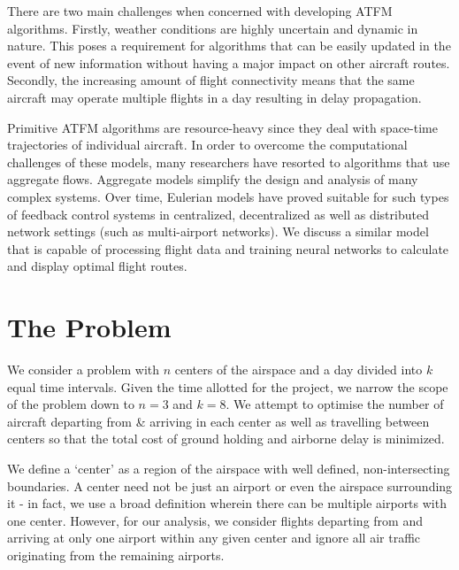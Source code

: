 \documentclass[conference]{IEEEtran}
\begin{document}
There are two main challenges when concerned with developing ATFM algorithms. Firstly, weather conditions are highly uncertain and dynamic in nature. This poses a requirement for algorithms that can be easily updated in the event of new information without having a major impact on other aircraft routes. Secondly, the increasing amount of flight connectivity means that the same aircraft may operate multiple flights in a day resulting in delay propagation.
\vspace{2mm}

Primitive ATFM algorithms are resource-heavy since they deal with space-time trajectories of individual aircraft. In order to overcome the computational challenges of these models, many researchers have resorted to algorithms that use aggregate flows. Aggregate models simplify the design and analysis of many complex systems. Over time, Eulerian models have proved suitable for such types of feedback control systems in centralized, decentralized as well as distributed network settings (such as multi-airport networks). We discuss a similar model that is capable of processing flight data and training neural networks to calculate and display optimal flight routes.

\section{\large The Problem}
\label{sec:sec2}
\vspace{1mm}

We consider a problem with $n$ centers of the airspace and a day divided into $k$ equal time intervals. Given the time allotted for the project, we narrow the scope of the problem down to $n=3$ and $k=8$. We attempt to optimise the number of aircraft departing from \& arriving in each center as well as travelling between centers so that the total cost of ground holding and airborne delay is minimized.
\vspace{2mm}

We define a `center' as a region of the airspace with well defined, non-intersecting boundaries. A center need not be just an airport or even the airspace surrounding it - in fact, we use a broad definition wherein there can be multiple airports with one center. However, for our analysis, we consider flights departing from and arriving at only one airport within any given center and ignore all air traffic originating from the remaining airports.
\vspace{2mm}
\end{document}
